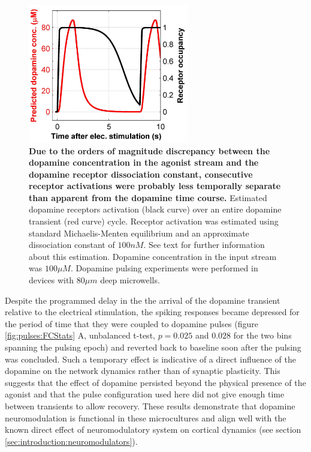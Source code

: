   \begin{figure}[h]
       \centering
       \includegraphics[width=7cm]{chapter6/figures/receptorSat/dopaminePulsingReceptorSat.jpg}

        \caption[Estimated dopamine receptor occupancy levels during a dopamine transient]{\textbf{Due to the orders of magnitude discrepancy between the dopamine concentration in the agonist stream and the dopamine receptor dissociation constant, consecutive receptor activations were probably less temporally separate than apparent from the dopamine time course.} Estimated dopamine receptors activation (black curve) over an entire dopamine transient (red curve) cycle. Receptor activation was estimated using standard Michaelis-Menten equilibrium and an approximate dissociation constant of \(100nM\). See text for further information about this estimation. Dopamine concentration in the input stream was \(100\mu M\). Dopamine pulsing experiments were performed in devices with \(80\mu m\) deep microwells.}

       \label{fig:pulses:receptorSat}

  \end{figure}

  Despite the programmed delay in the the arrival of the dopamine transient relative to the electrical stimulation, the spiking responses became depressed for the period of time that they were coupled to dopamine pulses (figure \ref{fig:pulses:FCStats} A, unbalanced t-test, \(p=0.025\) and \(0.028\) for the two bins spanning the pulsing epoch) and reverted back to baseline soon after the pulsing was concluded. Such a temporary effect is indicative of a direct influence of the dopamine on the network dynamics rather than of synaptic plasticity. This suggests that the effect of dopamine persisted beyond the physical presence of the agonist and that the pulse configuration used here did not give enough time between transients to allow recovery. These results demonstrate that dopamine neuromodulation is functional in these microcultures and align well with the known direct effect of neuromodulatory system on cortical dynamics (see section \ref{sec:introduction:neuromodulators}).

